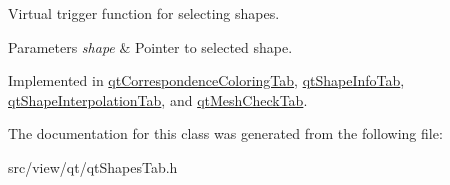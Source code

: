 Virtual trigger function for selecting shapes. 


\begin{DoxyParams}{Parameters}
{\em shape} & Pointer to selected shape. \\
\hline
\end{DoxyParams}


Implemented in \hyperlink{classqt_correspondence_coloring_tab_af02e0bad7197ef2a4fba5e67a6d5f4e2}{qt\+Correspondence\+Coloring\+Tab}, \hyperlink{classqt_shape_info_tab_a785dda79e10dfd05845e08ab1b4cdfd9}{qt\+Shape\+Info\+Tab}, \hyperlink{classqt_shape_interpolation_tab_a4db77c18d8b2257ac14654ef7c9f5ecd}{qt\+Shape\+Interpolation\+Tab}, and \hyperlink{classqt_mesh_check_tab_a72ed8ca09f9100689a41dec77523bf4e}{qt\+Mesh\+Check\+Tab}.



The documentation for this class was generated from the following file\+:\begin{DoxyCompactItemize}
\item 
src/view/qt/qt\+Shapes\+Tab.\+h\end{DoxyCompactItemize}

